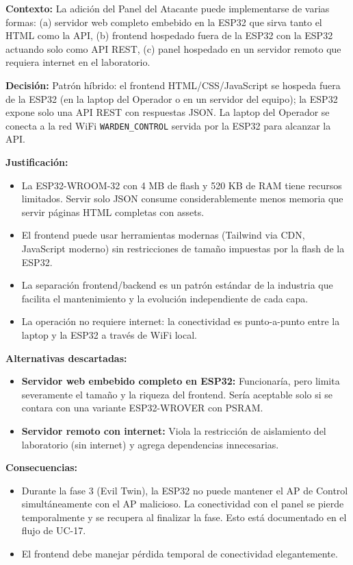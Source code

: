 \documentclass[11pt,a4paper]{article}
\begin{document}
\textbf{Contexto:} La adición del Panel del Atacante puede implementarse
de varias formas: (a) servidor web completo embebido en la ESP32 que
sirva tanto el HTML como la API, (b) frontend hospedado fuera de la
ESP32 con la ESP32 actuando solo como API REST, (c) panel hospedado en
un servidor remoto que requiera internet en el laboratorio.

\textbf{Decisión:} Patrón híbrido: el frontend HTML/CSS/JavaScript se
hospeda fuera de la ESP32 (en la laptop del Operador o en un servidor
del equipo); la ESP32 expone solo una API REST con respuestas JSON. La
laptop del Operador se conecta a la red WiFi \texttt{WARDEN\_CONTROL}
servida por la ESP32 para alcanzar la API.

\textbf{Justificación:}

\begin{itemize}
  \item La ESP32-WROOM-32 con 4 MB de flash y 520 KB de RAM tiene
    recursos limitados. Servir solo JSON consume considerablemente
    menos memoria que servir páginas HTML completas con assets.
  \item El frontend puede usar herramientas modernas (Tailwind via CDN,
    JavaScript moderno) sin restricciones de tamaño impuestas por la
    flash de la ESP32.
  \item La separación frontend/backend es un patrón estándar de la
    industria que facilita el mantenimiento y la evolución
    independiente de cada capa.
  \item La operación no requiere internet: la conectividad es
    punto-a-punto entre la laptop y la ESP32 a través de WiFi local.
\end{itemize}

\textbf{Alternativas descartadas:}

\begin{itemize}
  \item \textbf{Servidor web embebido completo en ESP32:} Funcionaría,
    pero limita severamente el tamaño y la riqueza del frontend. Sería
    aceptable solo si se contara con una variante ESP32-WROVER con
    PSRAM.
  \item \textbf{Servidor remoto con internet:} Viola la restricción de
    aislamiento del laboratorio (sin internet) y agrega dependencias
    innecesarias.
\end{itemize}

\textbf{Consecuencias:}

\begin{itemize}
  \item Durante la fase 3 (Evil Twin), la ESP32 no puede mantener el
    AP de Control simultáneamente con el AP malicioso. La conectividad
    con el panel se pierde temporalmente y se recupera al finalizar la
    fase. Esto está documentado en el flujo de UC-17.
  \item El frontend debe manejar pérdida temporal de conectividad
    elegantemente.
\end{itemize}
\end{document}
